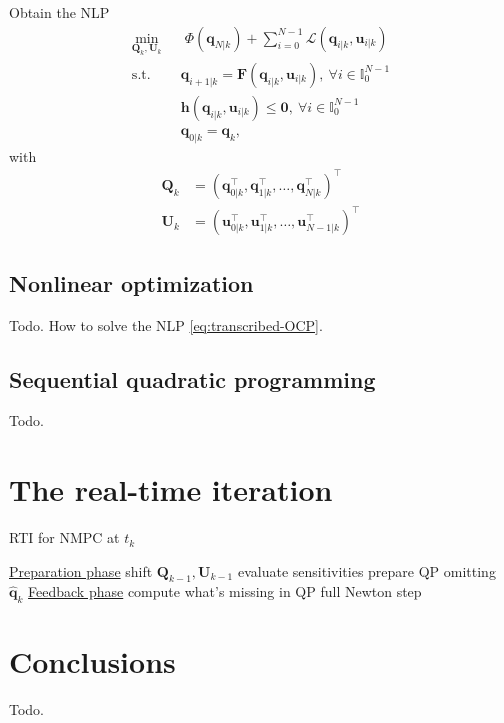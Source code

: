 Obtain the NLP
\begin{equation}
    \label{eq:transcribed-OCP}
    \begin{aligned}
        \min_{\bm{Q}_k, \bm{U}_k} \;\;
            & \; \Phi(\bm{q}_{N|k}) + \sum_{i=0}^{N-1} \mathcal{L}(\bm{q}_{i|k}, \bm{u}_{i|k}) \\
            \text{s.t. } & \bm{q}_{i+1|k} = \bm{F}(\bm{q}_{i|k}, \bm{u}_{i|k}), \ \forall i \in \mathbb{I}_{0}^{N-1} \\
                         & \bm{h}(\bm{q}_{i|k}, \bm{u}_{i|k}) \le \bm{0}, \ \forall i \in \mathbb{I}_{0}^{N-1} \\
                         & \bm{q}_{0|k} = \bm{q}_k,
    \end{aligned}
\end{equation}
with
\begin{align*}
\bm{Q}_k &= (\bm{q}_{0|k}^\top, \bm{q}_{1|k}^\top, \dots, \bm{q}_{N|k}^\top)^\top \\
\bm{U}_k &= (\bm{u}_{0|k}^\top, \bm{u}_{1|k}^\top, \dots, \bm{u}_{N-1|k}^\top)^\top
\end{align*}

\subsection{Nonlinear optimization}
Todo. How to solve the NLP \eqref{eq:transcribed-OCP}.

\subsection{Sequential quadratic programming}
Todo.

\section{The real-time iteration}
\begin{algorithm}
	\small
	\caption{RTI for NMPC at $t_k$}
	\label{alg:RTI}
    \underline{Preparation phase}\;
    shift $\bm{Q}_{k-1}, \bm{U}_{k-1}$\;
    evaluate sensitivities\;
    prepare QP omitting $\hat{\bm{q}}_k$\;
    \;
    \underline{Feedback phase}\;
    compute what's missing in QP\;
    full Newton step\;
    \;
\end{algorithm}

\section{Conclusions}
Todo.